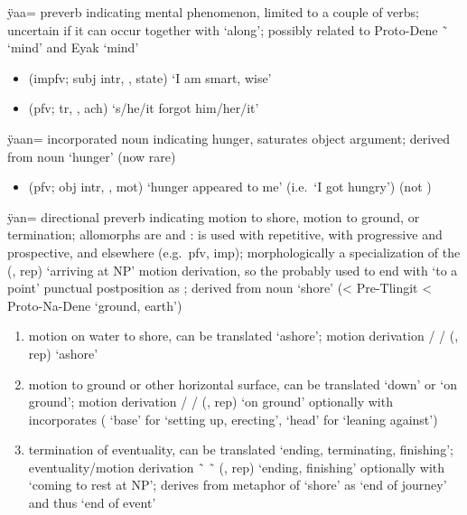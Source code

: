 \documentclass[12pt,letterpaper,oneside,article]{memoir}
\begin{document}
\begin{morphdesc}[resume*=alphalist]
\item[ÿaa=]
	preverb indicating mental phenomenon, limited to a couple of verbs;
	uncertain if it can occur together with  ‘along’;
	possibly related to Proto-Dene  \~\  ‘mind’ and Eyak  ‘mind’
	\begin{itemize}
	\item	{} (impfv; subj intr, ,  state) ‘I am smart, wise’
	\item	{} (pfv; tr, , ach) ‘s/he/it forgot him/her/it’
	\end{itemize}

\item[ÿaan=]
	incorporated noun indicating hunger,
	saturates object argument;
	derived from noun  ‘hunger’ (now rare)
	\begin{itemize}
	\item	{} (pfv; obj intr, , mot) ‘hunger appeared to me’ (i.e.\ ‘I got hungry’)\newline
		(not )
	\end{itemize}

\item[ÿan=]
	directional preverb indicating motion to shore, motion to ground, or termination;
	allomorphs are  and :
		 is used with repetitive,
		 with progressive and prospective,
		and  elsewhere (e.g.\ pfv, imp);
	morphologically a specialization of the
		 (,  rep) ‘arriving at NP’
		motion derivation,
	so the  probably used to end with  ‘to a point’ punctual postposition
		as ;
	derived from noun  ‘shore’
		(< Pre-Tlingit  < Proto-Na-Dene  ‘ground, earth’)
	\begin{enumerate}
	\item	motion on water to shore,
		can be translated ‘ashore’;
		motion derivation
			 /  /  (,  rep) ‘ashore’
	\item	motion to ground or other horizontal surface,
		can be translated ‘down’ or ‘on ground’;
		motion derivation
			 /  /  (,  rep) ‘on ground’
			optionally with incorporates ( ‘base’ for ‘setting up, erecting’,
			 ‘head’ for ‘leaning against’)
	\item	termination of eventuality,
		can be translated ‘ending, terminating, finishing’;
		eventuality/motion derivation
			 \~\  \~\  (,  rep) ‘ending, finishing’
			optionally with  ‘coming to rest at NP’;
		derives from metaphor of ‘shore’ as ‘end of journey’ and thus ‘end of event’
	\end{enumerate}


\end{morphdesc}
\end{document}
